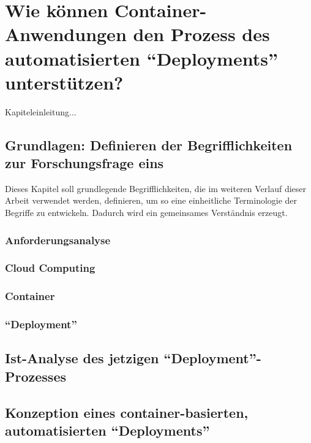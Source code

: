 \chapter{Wie können Container-Anwendungen den Prozess des automatisierten \enquote{Deployments} unterstützen?} \label{ff1}
Kapiteleinleitung...

\section{Grundlagen: Definieren der Begrifflichkeiten zur Forschungsfrage eins}
Dieses Kapitel soll grundlegende Begrifflichkeiten, die im weiteren Verlauf dieser Arbeit verwendet werden, definieren, um so eine einheitliche Terminologie der Begriffe zu entwickeln. Dadurch wird ein gemeinsames Verständnis erzeugt.

\subsection{Anforderungsanalyse}

\subsection{Cloud Computing}

\subsection{Container}

\subsection{\enquote{Deployment}} \label{defDeployment}

\section{Ist-Analyse des jetzigen \enquote{Deployment}-Prozesses}

\section{Konzeption eines container-basierten, automatisierten \enquote{Deployments}}
